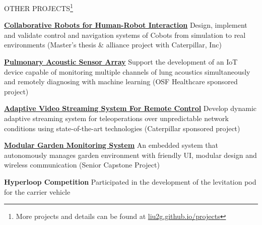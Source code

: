 \documentclass{lib/resume} %
\begin{document}
\begin{rSection}{OTHER PROJECTS\footnote{More projects and details can be found at \url{liu2g.github.io/projects}}}
    \vspace{-1em}
    \item \href{https://liu2g.github.io/cobots-sim/}{\textbf{Collaborative Robots for Human-Robot Interaction}} Design, implement and validate control and navigation systems of Cobots from simulation to real environments (Master's thesis \& alliance project with Caterpillar, Inc)
    \item \href{https://liu2g.github.io/pasta/}{\textbf{Pulmonary Acoustic Sensor Array}} Support the development of an IoT device capable of monitoring multiple channels of lung acoustics simultaneously and remotely diagnosing with machine learning (OSF Healthcare sponsored project)
    \item \href{https://liu2g.github.io/teleop-video/}{\textbf{Adaptive Video Streaming System For Remote Control}} {Develop dynamic adaptive streaming system for teleoperations over unpredictable network conditions using state-of-the-art technologies (Caterpillar sponsored project)}
    \item \href{https://github.com/liu2g/mgms}{\textbf{Modular Garden Monitoring System}} {An embedded system that autonomously manages garden environment with friendly UI, modular design and wireless communication (Senior Capstone Project)}
    \item \textbf{Hyperloop Competition} {Participated in the development of the levitation pod for the carrier vehicle}

\end{rSection}
\end{document}
